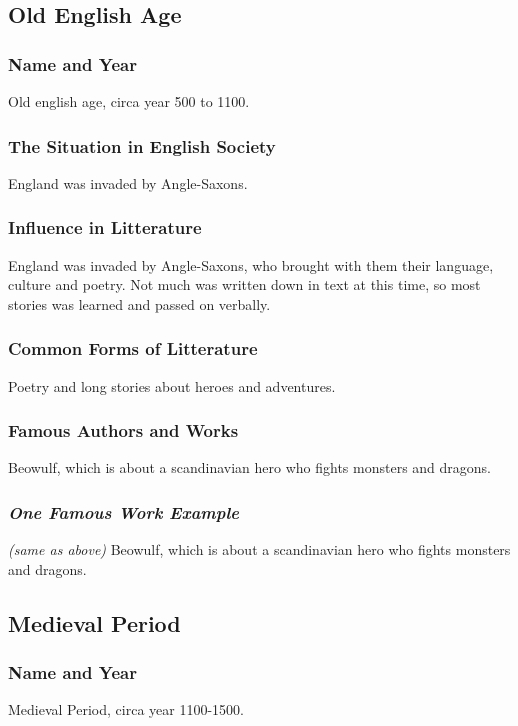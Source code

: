 \subsection{Old English Age}

\subsubsection{Name and Year}
Old english age, circa year 500 to 1100.

\subsubsection{The Situation in English Society}
England was invaded by Angle-Saxons.

\subsubsection{Influence in Litterature}
England was invaded by Angle-Saxons, who brought with them their language, culture and poetry. Not much was written down in text at this time, so most stories was learned and passed on verbally.

\subsubsection{Common Forms of Litterature}
Poetry and long stories about heroes and adventures.

\subsubsection{Famous Authors and Works}
Beowulf, which is about a scandinavian hero who fights monsters and dragons.

\subsubsection{\textit{One Famous Work Example}}
\textit{(same as above)} Beowulf, which is about a scandinavian hero who fights monsters and dragons.

\newpage
\subsection{Medieval Period}

\subsubsection{Name and Year}
Medieval Period, circa year 1100-1500.

